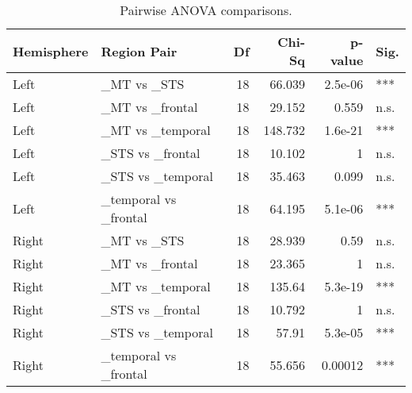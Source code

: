 \begin{table}[h]
\centering
\begin{tabular}{llrrrl}
\toprule
 Hemisphere   & Region Pair           &   Df &   Chi-Sq &   p-value & Sig.   \\
\midrule
 Left         & \_MT vs \_STS           &   18 &   66.039 &   2.5e-06 & ***    \\
 Left         & \_MT vs \_frontal       &   18 &   29.152 &   0.559   & n.s.   \\
 Left         & \_MT vs \_temporal      &   18 &  148.732 &   1.6e-21 & ***    \\
 Left         & \_STS vs \_frontal      &   18 &   10.102 &   1       & n.s.   \\
 Left         & \_STS vs \_temporal     &   18 &   35.463 &   0.099   & n.s.   \\
 Left         & \_temporal vs \_frontal &   18 &   64.195 &   5.1e-06 & ***    \\
 Right        & \_MT vs \_STS           &   18 &   28.939 &   0.59    & n.s.   \\
 Right        & \_MT vs \_frontal       &   18 &   23.365 &   1       & n.s.   \\
 Right        & \_MT vs \_temporal      &   18 &  135.64  &   5.3e-19 & ***    \\
 Right        & \_STS vs \_frontal      &   18 &   10.792 &   1       & n.s.   \\
 Right        & \_STS vs \_temporal     &   18 &   57.91  &   5.3e-05 & ***    \\
 Right        & \_temporal vs \_frontal &   18 &   55.656 &   0.00012 & ***    \\
\bottomrule
\end{tabular}
\caption{Pairwise ANOVA comparisons.}
\end{table}
